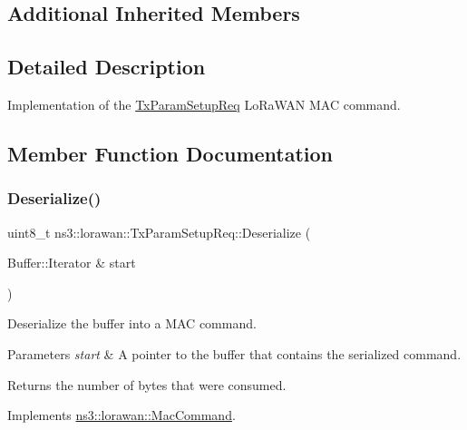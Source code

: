 \subsection*{Additional Inherited Members}


\subsection{Detailed Description}
Implementation of the \hyperlink{classns3_1_1lorawan_1_1TxParamSetupReq}{Tx\+Param\+Setup\+Req} Lo\+Ra\+W\+AN M\+AC command. 

\subsection{Member Function Documentation}
\mbox{\label{classns3_1_1lorawan_1_1TxParamSetupReq_a2179d7c1a0804bc8a6d42fc638625472}} 
\subsubsection{\texorpdfstring{Deserialize()}{Deserialize()}}
{\footnotesize\ttfamily uint8\+\_\+t ns3\+::lorawan\+::\+Tx\+Param\+Setup\+Req\+::\+Deserialize (\begin{DoxyParamCaption}\item[{Buffer\+::\+Iterator \&}]{start }\end{DoxyParamCaption})\hspace{0.3cm}{\ttfamily [virtual]}}

Deserialize the buffer into a M\+AC command.


\begin{DoxyParams}{Parameters}
{\em start} & A pointer to the buffer that contains the serialized command. \\
\hline
\end{DoxyParams}
\begin{DoxyReturn}{Returns}
the number of bytes that were consumed. 
\end{DoxyReturn}


Implements \hyperlink{classns3_1_1lorawan_1_1MacCommand_af12d223a71a67196bce498f1240eda75}{ns3\+::lorawan\+::\+Mac\+Command}.

\mbox{\label{classns3_1_1lorawan_1_1TxParamSetupReq_ab4032edd01d5ba3139d3a5896918bf19}} 
